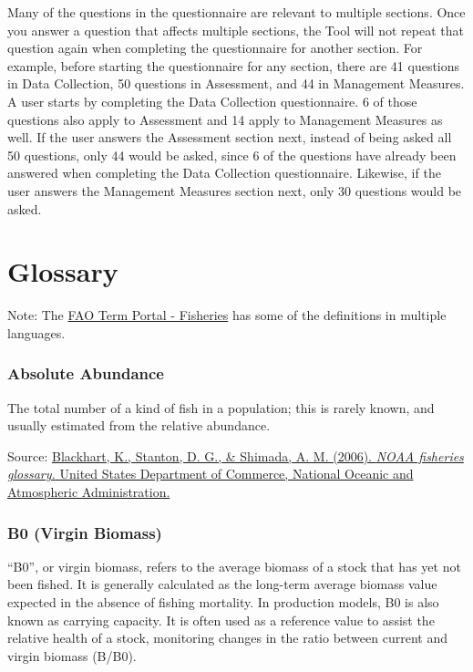\documentclass[
  11pt,
]{book}
\begin{document}
Many of the questions in the questionnaire are relevant to multiple sections. Once you answer a question that affects multiple sections, the Tool will not repeat that question again when completing the questionnaire for another section. For example, before starting the questionnaire for any section, there are 41 questions in Data Collection, 50 questions in Assessment, and 44 in Management Measures. A user starts by completing the Data Collection questionnaire. 6 of those questions also apply to Assessment and 14 apply to Management Measures as well. If the user answers the Assessment section next, instead of being asked all 50 questions, only 44 would be asked, since 6 of the questions have already been answered when completing the Data Collection questionnaire. Likewise, if the user answers the Management Measures section next, only 30 questions would be asked.

\hypertarget{glossary}{%
\chapter{Glossary}\label{glossary}}





Note: The \href{http://www.fao.org/fishery/glossary/en}{FAO Term Portal - Fisheries} has some of the definitions in multiple languages.

\hypertarget{absolute-abundance}{%
\subsection{Absolute Abundance}\label{absolute-abundance}}

The total number of a kind of ﬁsh in a population; this is rarely known, and usually estimated from the relative abundance.

Source: \href{https://repository.library.noaa.gov/view/noaa/12856}{Blackhart, K., Stanton, D. G., \& Shimada, A. M. (2006). \emph{NOAA fisheries glossary.} United States Department of Commerce, National Oceanic and Atmospheric Administration.}

\hypertarget{b0-virgin-biomass}{%
\subsection{B0 (Virgin Biomass)}\label{b0-virgin-biomass}}

``B0'', or virgin biomass, refers to the average biomass of a stock that has yet not been fished. It is generally calculated as the long-term average biomass value expected in the absence of fishing mortality. In production models, B0 is also known as carrying capacity. It is often used as a reference value to assist the relative health of a stock, monitoring changes in the ratio between current and virgin biomass (B/B0).
\end{document}
